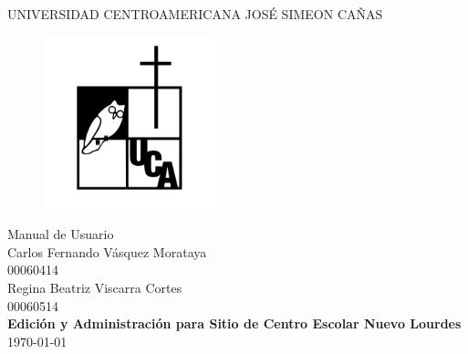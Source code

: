 \documentclass[11pt]{article}
\begin{document}
\begin{titlepage}
\begin{center}
\huge{UNIVERSIDAD CENTROAMERICANA JOSÉ SIMEON CAÑAS}
\end{center}

\begin{figure}[htbp]
  \centering
  \includegraphics[width=5cm]{../static/img/logo_uca.png}
\end{figure}

\begin{center}
  \huge{Manual de Usuario}\\
  \vspace{1.2cm}
  \Large{Carlos Fernando Vásquez Morataya\\00060414}\\
  \Large{Regina Beatriz Viscarra Cortes\\00060514}\\
  \vspace{1.2cm}
  \huge{\textbf{Edición y Administración para Sitio de Centro Escolar Nuevo Lourdes}}\\
  \normalsize{\today}
\end{center}
\end{titlepage}
\tableofcontents

\newpage

\end{document}
